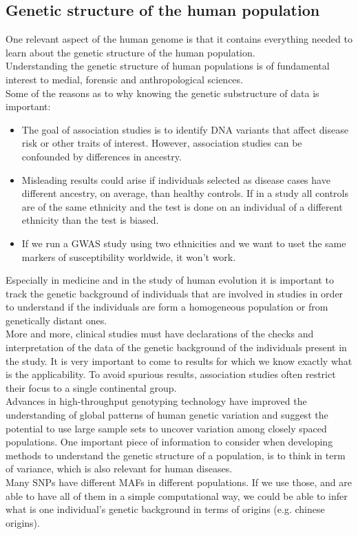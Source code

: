 \subsection{Genetic structure of the human population}
One relevant aspect of the human genome is that it contains everything needed to learn about the genetic structure of the human population.
\\
Understanding the genetic structure of human populations is of fundamental interest to medial, forensic and anthropological sciences.
\\
Some of the reasons as to why knowing the genetic substructure of data is important:
\begin{itemize}
	\item The goal of association studies is to identify DNA variants that affect disease risk or other traits of interest. However, association studies can be confounded by differences in ancestry.
	\item Misleading results could arise if individuals selected as disease cases have different ancestry, on average, than healthy controls. If in a study all controls are of the same ethnicity and the test is done on an individual of a different ethnicity than the test is biased.
 	\item If we run a GWAS study using two ethnicities and we want to uset the same markers of susceptibility worldwide, it won't work.
\end{itemize}

Especially in medicine and in the study of human evolution it is important to track the genetic background of individuals that are involved in studies in order to understand if the individuals are form a homogeneous population or from genetically distant ones. \\
More and more, clinical studies must have declarations of the checks and interpretation of the data of the genetic background of the individuals present in the study. It is very important to come to results for which we know exactly what is the applicability. To avoid spurious results, association studies often restrict their focus to a single continental group.
\\
Advances in high-throughput genotyping technology have improved the understanding of global patterns of human genetic variation and suggest the potential to use large sample sets to uncover variation among closely spaced populations.
One important piece of information to consider when developing methods to understand the genetic structure of a population, is to think in term of variance, which is also relevant for human diseases.
\\
Many SNPs have different MAFs in different populations. If we use those, and are able to have all of them in a simple computational way, we could be able to infer what is one individual's genetic background in terms of origins (e.g. chinese origins).

